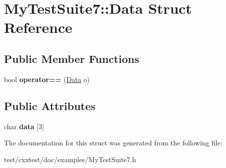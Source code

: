 \hypertarget{structMyTestSuite7_1_1Data}{\section{My\-Test\-Suite7\-:\-:Data Struct Reference}
\label{structMyTestSuite7_1_1Data}
}
\subsection*{Public Member Functions}
\begin{DoxyCompactItemize}
\item 
\hypertarget{structMyTestSuite7_1_1Data_a6dedbb9d7047fb64bcbaae4da11431db}{bool {\bfseries operator==} (\hyperlink{structMyTestSuite7_1_1Data}{Data} o)}\label{structMyTestSuite7_1_1Data_a6dedbb9d7047fb64bcbaae4da11431db}

\end{DoxyCompactItemize}
\subsection*{Public Attributes}
\begin{DoxyCompactItemize}
\item 
\hypertarget{structMyTestSuite7_1_1Data_a88d7a034c6ccb4ba767ffad6b12f6b01}{char {\bfseries data} \mbox{[}3\mbox{]}}\label{structMyTestSuite7_1_1Data_a88d7a034c6ccb4ba767ffad6b12f6b01}

\end{DoxyCompactItemize}


The documentation for this struct was generated from the following file\-:\begin{DoxyCompactItemize}
\item 
test/cxxtest/doc/examples/My\-Test\-Suite7.\-h\end{DoxyCompactItemize}
